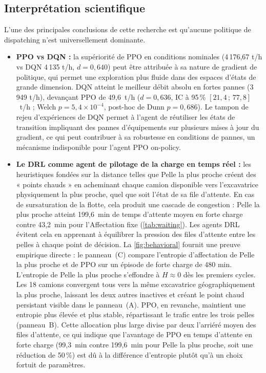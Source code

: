 \documentclass[11pt,a4paper]{article}
\begin{document}
\subsection{Interprétation scientifique}

L'une des principales conclusions de cette recherche est qu'aucune politique de dispatching n'est universellement dominante.

\begin{itemize}
  \item \textbf{PPO vs DQN :} la supériorité de PPO en conditions nominales (4\,176,67 t/h vs DQN 4\,135 t/h, $d=0{,}640$) peut être attribuée à sa nature de gradient de politique, qui permet une exploration plus fluide dans des espaces d'états de grande dimension. DQN atteint le meilleur débit absolu en fortes pannes (3\,949 t/h), devançant PPO de 49,6~t/h ($d=0{,}636$, IC à 95\,\% $[21{,}4\,;\,77{,}8]$~t/h ; Welch $p=5{,}4\times10^{-4}$, post-hoc de Dunn $p=0{,}686$). Le tampon de rejeu d'expériences de DQN permet à l'agent de réutiliser les états de transition impliquant des pannes d'équipements sur plusieurs mises à jour du gradient, ce qui peut contribuer à sa robustesse en conditions de pannes, un mécanisme indisponible pour l'agent PPO on-policy.
  \item \textbf{Le DRL comme agent de pilotage de la charge en temps réel :} les heuristiques fondées sur la distance telles que Pelle la plus proche créent des « points chauds » en acheminant chaque camion disponible vers l'excavatrice physiquement la plus proche, quel que soit l'état de sa file d'attente. En cas de sursaturation de la flotte, cela produit une cascade de congestion : Pelle la plus proche atteint 199,6~min de temps d'attente moyen en forte charge contre 43,2~min pour l'Affectation fixe (\cref{tab:waiting}). Les agents DRL évitent cela en apprenant à équilibrer la pression des files d'attente entre les pelles à chaque point de décision. La \cref{fig:behavioral} fournit une preuve empirique directe : le panneau~(C) compare l'entropie d'affectation de Pelle la plus proche et de PPO sur un épisode de forte charge de 480 min. L'entropie de Pelle la plus proche s'effondre à $H\approx 0$ dès les premiers cycles. Les 18 camions convergent tous vers la même excavatrice géographiquement la plus proche, laissant les deux autres inactives et créant le point chaud persistant visible dans le panneau~(A). PPO, en revanche, maintient une entropie plus élevée et plus stable, répartissant le trafic entre les trois pelles (panneau~B). Cette allocation plus large divise par deux l'arriéré moyen des files d'attente, ce qui indique que l'avantage de PPO en temps d'attente en forte charge (99,3~min contre 199,6~min pour Pelle la plus proche, soit une réduction de 50\,\%) est dû à la différence d'entropie plutôt qu'à un choix fortuit de paramètres.

\end{itemize}
\end{document}
